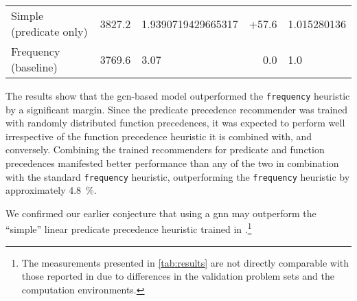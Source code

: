 \begin{table*}[ht]
\begin{tabular}{l|ll|rl}
Simple (predicate only) &
\num{3827.2} &
\num[round-mode=places,round-precision=2]{1.9390719429665317} &
+57.6 &
\num[round-mode=places,round-precision=3]{1.015280136} \\




Frequency (baseline) &
\num{3769.6} &
\num{3.07} &
0.0 &
\num[round-mode=places,round-precision=3]{1.0} \\

\end{tabular}
\end{table*}

The results show that the \gls{gcn}-based model outperformed the \texttt{frequency} heuristic by a significant margin.
Since the predicate precedence recommender was trained with randomly distributed function precedences,
it was expected to perform well irrespective of the function precedence heuristic it is combined with, and conversely.
Combining the trained recommenders for predicate and function precedences manifested better performance
than any of the two in combination with the standard \texttt{frequency} heuristic,
outperforming the \texttt{frequency} heuristic by approximately \SI{4.8}{\percent}.

We confirmed our earlier conjecture \cite{DBLP:conf/cade/Bartek020} that using a \gls{gnn}
may outperform the ``simple'' linear predicate precedence heuristic
trained in \cite{DBLP:conf/cade/Bartek020}.\footnote{The measurements presented in \cref{tab:results}
are not directly comparable with those reported in \cite{DBLP:conf/cade/Bartek020}
due to differences in the validation problem sets and the computation environments.}

